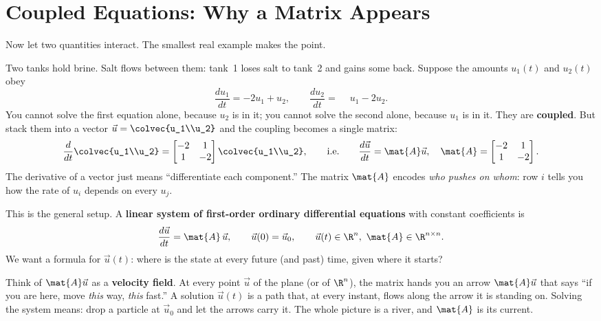 \section{Coupled Equations: Why a Matrix Appears}
\label{ch25:coupled}

Now let two quantities interact. The smallest real example makes the point.

\begin{example}
\label{ch25:tanks}
Two tanks hold brine. Salt flows between them: tank~1 loses salt to tank~2 and
gains some back. Suppose the amounts $u_1(t)$ and $u_2(t)$ obey
\[
  \frac{du_1}{dt} = -2u_1 + u_2, \qquad
  \frac{du_2}{dt} = \phantom{-}u_1 - 2u_2.
\]
You cannot solve the first equation alone, because $u_2$ is in it; you cannot
solve the second alone, because $u_1$ is in it. They are \textbf{coupled}. But
stack them into a vector $\vec{u} = \colvec{u_1\\u_2}$ and the coupling becomes a
single matrix:
\[
  \frac{d}{dt}\colvec{u_1\\u_2}
  = \begin{bmatrix} -2 & 1 \\ 1 & -2 \end{bmatrix}\colvec{u_1\\u_2},
  \qquad\text{i.e.}\qquad
  \frac{d\vec{u}}{dt} = \mat{A}\vec{u},
  \quad \mat{A} = \begin{bmatrix} -2 & 1 \\ 1 & -2 \end{bmatrix}.
\]
The derivative of a vector just means ``differentiate each component.'' The
matrix $\mat{A}$ encodes \emph{who pushes on whom}: row $i$ tells you how the
rate of $u_i$ depends on every $u_j$.
\end{example}

This is the general setup. A \textbf{linear system of first-order ordinary
differential equations} with constant coefficients is
\[
  \frac{d\vec{u}}{dt} = \mat{A}\,\vec{u},
  \qquad \vec{u}(0) = \vec{u}_0,
  \qquad \vec{u}(t)\in\R^n,\ \mat{A}\in\R^{n\times n}.
\]
We want a formula for $\vec{u}(t)$: where is the state at every future (and past)
time, given where it starts?

\begin{intuitionbox}
Think of $\mat{A}\vec{u}$ as a \textbf{velocity field}. At every point $\vec{u}$
of the plane (or of $\R^n$), the matrix hands you an arrow $\mat{A}\vec{u}$ that
says ``if you are here, move \emph{this} way, \emph{this} fast.'' A solution
$\vec{u}(t)$ is a path that, at every instant, flows along the arrow it is
standing on. Solving the system means: drop a particle at $\vec{u}_0$ and let the
arrows carry it. The whole picture is a river, and $\mat{A}$ is its current.
\end{intuitionbox}

